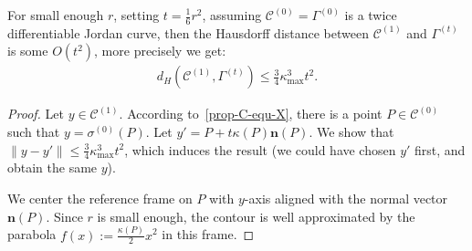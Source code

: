 \documentclass[review]{siamart220329}
\newcommand{\C}{\mathcal{C}} %
\begin{document}
\begin{proposition}\label{prop:bcf-close-to-csf}
  For small enough $r$, setting $t = \frac{1}{6}r^2$, assuming $\C^{(0)}=\Gamma^{(0)}$ is a twice differentiable Jordan curve, then the Hausdorff distance between
  $\C^{(1)}$ and $\Gamma^{(t)}$ is some $O(t^2)$, more precisely we get:
  \begin{align*}
    d_H( \C^{(1)}, \Gamma^{(t)} ) \le \frac{3}{4} \kappa_{\max}^3 t^2.
  \end{align*}
\end{proposition}
\begin{proof}
  Let $y \in \C^{(1)}$. According to~\cref{prop-C-equ-X},
  there is a point $P \in \C^{(0)}$ such that
  $y=\sigma^{(0)}(P)$. Let $y'=P+t\kappa(P)\mathbf{n}(P)$. We
  show that $\| y-y' \| \le \frac{3}{4} \kappa_{\max}^3 t^2$,
  which induces the result (we could have chosen $y'$ first, and
  obtain the same $y$).

  We center the reference frame on $P$ with $y$-axis aligned with the
  normal vector $\mathbf{n}(P)$.  Since $r$ is small enough, the
  contour is well approximated by the parabola $f(x) :=
  \frac{\kappa(P)}{2}x^2$ in this frame.


\end{proof}
\end{document}
